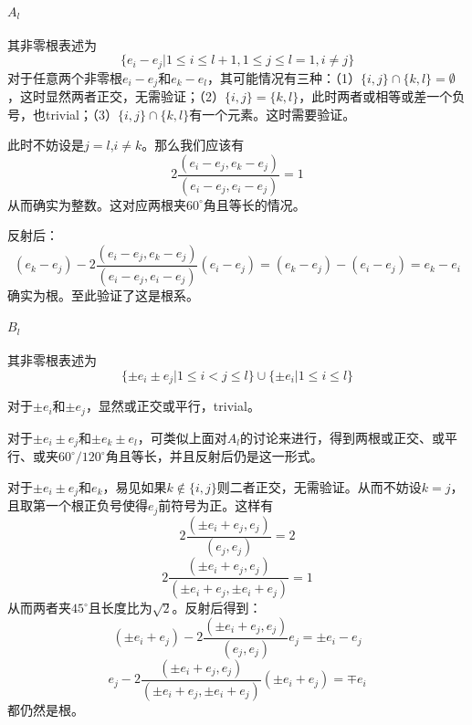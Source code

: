 \documentclass{ctexart}
\begin{document}
	\paragraph{$A_l$}
	
	其非零根表述为
	\begin{equation}
	\{e_i-e_j|1\leq i\leq l+1,1\leq j\leq l=1,i\neq j\}
	\end{equation}
	对于任意两个非零根$e_i-e_j$和$e_k-e_l$，其可能情况有三种：（1）$\{i,j\}\cap\{k,l\}=\emptyset$，这时显然两者正交，无需验证；（2）$\{i,j\}=\{k,l\}$，此时两者或相等或差一个负号，也trivial；（3）$\{i,j\}\cap\{k,l\}$有一个元素。这时需要验证。
	
	此时不妨设是$j=l$,$i\neq k$。那么我们应该有
	\begin{equation}
	2\frac{(e_i-e_j,e_k-e_j)}{(e_i-e_j,e_i-e_j)}=1
	\end{equation}
	从而确实为整数。这对应两根夹$60^\circ$角且等长的情况。
	
	反射后：
	\begin{equation}
	(e_k-e_j)-2\frac{(e_i-e_j,e_k-e_j)}{(e_i-e_j,e_i-e_j)}(e_i-e_j)=(e_k-e_j)-(e_i-e_j)=e_k-e_i
	\end{equation}
	确实为根。至此验证了这是根系。
	
	\paragraph{$B_l$}
	
	其非零根表述为
	\begin{equation}
	\{\pm e_i\pm e_j|1\leq i<j\leq l\}\cup\{\pm e_i|1\leq i\leq l\}
	\end{equation}
	
	对于$\pm e_i$和$\pm e_j$，显然或正交或平行，trivial。
	
	对于$\pm e_i\pm e_j$和$\pm e_k\pm e_l$，可类似上面对$A_l$的讨论来进行，得到两根或正交、或平行、或夹$60^\circ/120^\circ$角且等长，并且反射后仍是这一形式。
	
	对于$\pm e_i\pm e_j$和$e_k$，易见如果$k\notin\{i,j\}$则二者正交，无需验证。从而不妨设$k=j$，且取第一个根正负号使得$e_j$前符号为正。这样有
	\begin{equation}
	2\frac{(\pm e_i+e_j,e_j)}{(e_j,e_j)}=2
	\end{equation}
	\begin{equation}
	2\frac{(\pm e_i+e_j,e_j)}{(\pm e_i+e_j,\pm e_i+e_j)}=1
	\end{equation}
	从而两者夹$45^\circ$且长度比为$\sqrt 2$。反射后得到：
	\begin{equation}
	(\pm e_i+e_j)-2\frac{(\pm e_i+e_j,e_j)}{(e_j,e_j)}e_j=\pm e_i-e_j
	\end{equation}
	\begin{equation}
	e_j-2\frac{(\pm e_i+e_j,e_j)}{(\pm e_i+e_j,\pm e_i+e_j)}(\pm e_i+e_j)=\mp e_i
	\end{equation}
	都仍然是根。
	
\end{document}

